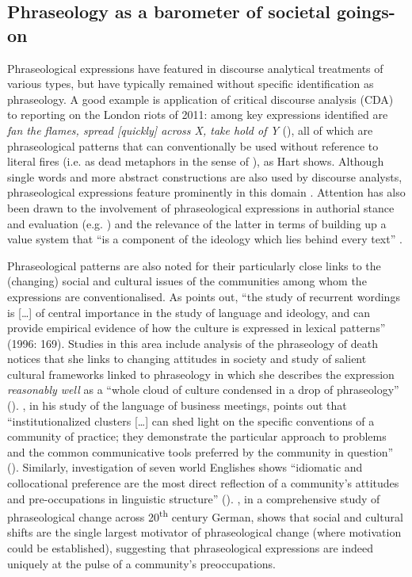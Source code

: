\documentclass[output=paper]{langscibook}
\begin{document}
\subsection{Phraseology as a barometer of societal goings-on}

Phraseological expressions have featured in discourse analytical treatments of various types, but have typically remained without specific identification as phraseology. A good example is  application of critical discourse analysis (CDA) to reporting on the London riots of 2011: among key expressions identified are \textit{fan the flames, spread [quickly] across X, take hold of Y} (\citeyear[284--285]{Hart2017}), all of which are phraseological patterns that can conventionally be used without reference to literal fires (i.e. as dead metaphors in the sense of \citealt{LakoffJohnson1980}), as Hart shows. Although single words and more abstract constructions are also used by discourse analysts, phraseological expressions feature prominently in this domain \citep{Stubbs2002}. Attention has also been drawn to the involvement of phraseological expressions in authorial stance and evaluation (e.g. \citealt{Hunston2011,Biber2006}) and the relevance of the latter in terms of building up a value system that ``is a component of the ideology which lies behind every text'' \citep[6]{ThompsonHunston2000}.

Phraseological patterns are also noted for their particularly close links to the (changing) social and cultural issues of the communities among whom the expressions are conventionalised. As \citet{Stubbs1996} points out, “the study of recurrent wordings is […] of central importance in the study of language and ideology, and can provide empirical evidence of how the culture is expressed in lexical patterns” (1996: 169). Studies in this area include  analysis of the phraseology of death notices that she links to changing attitudes in society and  study of salient cultural frameworks linked to phraseology in which she describes the expression \textit{reasonably well} as a “whole cloud of culture condensed in a drop of phraseology” (\citeyear[50]{Wierzbicka2007}). \citet{Handford2010}, in his study of the language of business meetings, points out that “institutionalized clusters […] can shed light on the specific conventions of a community of practice; they demonstrate the particular approach to problems and the common communicative tools preferred by the community in question” (\citeyear[144]{Handford2010}). Similarly,  investigation of seven world Englishes shows “idiomatic and collocational preference are the most direct reflection of a community’s attitudes and pre-occupations in linguistic structure” (\citeyear[439]{Mair2007}). \citet{Buerki2020}, in a comprehensive study of phraseological change across 20\textsuperscript{th} century German, shows that social and cultural shifts are the single largest motivator of phraseological change (where motivation could be established), suggesting that phraseological expressions are indeed uniquely at the pulse of a community’s preoccupations.
\end{document}
